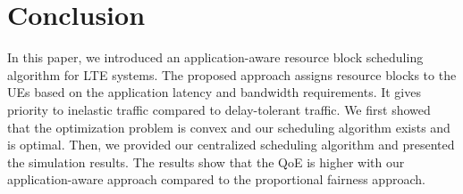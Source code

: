 \documentclass[conference]{IEEEtran}
\begin{document}
\section{Conclusion}\label{sec:conclude}
In this paper, we introduced an application-aware resource block scheduling algorithm for LTE systems. The proposed approach assigns resource blocks to the UEs based on the application latency and bandwidth requirements. It gives priority to inelastic traffic compared to delay-tolerant traffic. We first showed that the optimization problem is convex and our scheduling algorithm exists and is optimal. Then, we provided our centralized scheduling algorithm and presented the simulation results. The results show that the QoE is higher with our application-aware approach compared to the proportional fairness approach.   


\end{document}
